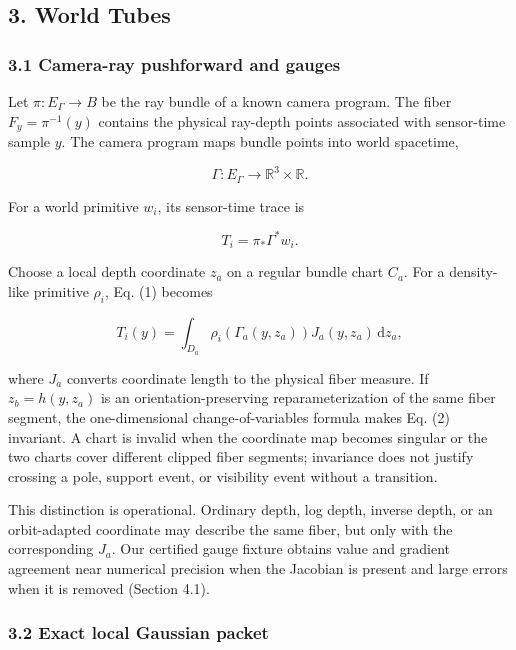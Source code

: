 \documentclass[
]{article}
\begin{document}
\subsection{3. World Tubes}\label{world-tubes}

\subsubsection{3.1 Camera-ray pushforward and
gauges}\label{camera-ray-pushforward-and-gauges}

Let \(\pi:E_\Gamma\rightarrow B\) be the ray bundle of a known camera
program. The fiber \(F_y=\pi^{-1}(y)\) contains the physical ray-depth
points associated with sensor-time sample \(y\). The camera program maps
bundle points into world spacetime,

\[
  \Gamma:E_\Gamma\rightarrow\mathbb R^3\times\mathbb R.
\]

For a world primitive \(w_i\), its sensor-time trace is

\[
  T_i=\pi_*\Gamma^*w_i.
  \tag{1}
\]

Choose a local depth coordinate \(z_a\) on a regular bundle chart
\(C_a\). For a density-like primitive \(\rho_i\), Eq. (1) becomes

\[
  T_i(y)=\int_{D_a}
  \rho_i\!\left(\Gamma_a(y,z_a)\right)
  J_a(y,z_a)\,\mathrm dz_a,
  \tag{2}
\]

where \(J_a\) converts coordinate length to the physical fiber measure.
If \(z_b=h(y,z_a)\) is an orientation-preserving reparameterization of
the same fiber segment, the one-dimensional change-of-variables formula
makes Eq. (2) invariant. A chart is invalid when the coordinate map
becomes singular or the two charts cover different clipped fiber
segments; invariance does not justify crossing a pole, support event, or
visibility event without a transition.

This distinction is operational. Ordinary depth, log depth, inverse
depth, or an orbit-adapted coordinate may describe the same fiber, but
only with the corresponding \(J_a\). Our certified gauge fixture obtains
value and gradient agreement near numerical precision when the Jacobian
is present and large errors when it is removed (Section 4.1).

\subsubsection{3.2 Exact local Gaussian
packet}\label{exact-local-gaussian-packet}
\end{document}
